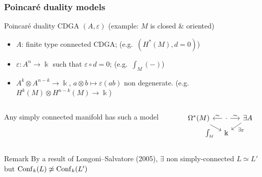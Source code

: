 \documentclass{beamer}
\begin{document}
\begin{frame}
  \frametitle{Poincaré duality models}
  \alert<1-3>{Poincaré duality CDGA} $(A, \varepsilon)$ {\tiny \hfill (example: $M$ is closed \& oriented)}
  \begin{itemize}[<+->]
  \item $A$: finite type connected CDGA; {\tiny \hfill (e.g.\ $(H^{*}(M), d=0)$)}
  \item $\varepsilon : A^{n} \to \Bbbk$ such that $\varepsilon \circ d = 0$; {\tiny \hfill (e.g.\ $\int_{M} (-)$)}
  \item $A^{k} \otimes A^{n-k} \to \Bbbk, \, a \otimes b \mapsto \varepsilon(ab)$ non degenerate. {\tiny \hfill (e.g.\ $H^{k}(M) \otimes H^{n-k}(M) \to \Bbbk$)}
  \end{itemize}

  \pause[\thebeamerpauses]
  \begin{columns}
    \begin{column}{0.6\linewidth}
      \begin{theorem}
        Any \alert<3>{simply connected} manifold has such a model
      \end{theorem}
    \end{column}
    \begin{column}{0.4\linewidth}
      \[ \begin{tikzcd}[ampersand replacement=\&, row sep = tiny, column sep = small]
          \Omega^{*}(M) \ar[dr, "\int_{M}" swap] \& \cdot \ar[l, "\sim" swap] \ar[r, "\sim"] \& \exists A \ar[dl, "\exists \varepsilon"] \\
          {} \& \Bbbk
        \end{tikzcd} \]
    \end{column}
  \end{columns}

  \pause
  \begin{block}{Remark}
    By a result of Longoni--Salvatore (2005), $\exists$ non simply-connected $L \simeq L'$ but $\operatorname{Conf}_{k}(L) \not\simeq \operatorname{Conf}_{k}(L')$
  \end{block}
\end{frame}
\end{document}
